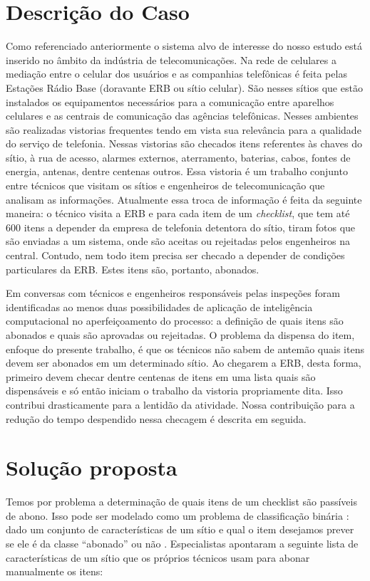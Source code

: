 \documentclass[
	12pt,				%
	openany,			%
	oneside,			%
	a4paper,			%
	english,			%
	french,				%
	spanish,			%
	brazil,				%
	]{abntex2}
\begin{document}
\chapter[Descrição do Caso]{Descrição do Caso}
Como referenciado anteriormente o sistema alvo de interesse do nosso estudo está
inserido no âmbito da indústria de telecomunicações. Na rede de celulares a
mediação entre o celular dos usuários e as companhias telefônicas é feita pelas
Estações Rádio Base (doravante ERB ou sítio celular). São nesses sítios que
estão instalados os equipamentos necessários para a comunicação entre aparelhos
celulares e as centrais de comunicação das agências telefônicas. Nesses
ambientes são realizadas vistorias frequentes tendo em vista sua relevância para
a qualidade do serviço de telefonia. Nessas vistorias são checados itens
referentes às chaves do sítio, à rua de acesso, alarmes externos, aterramento,
baterias, cabos, fontes de energia, antenas, dentre centenas outros. Essa
vistoria é um trabalho conjunto entre técnicos que visitam os sítios e
engenheiros de telecomunicação que analisam as informações. Atualmente essa
troca de informação é feita da seguinte maneira: o técnico visita a ERB e para
cada item de um \textit{checklist}, que tem até 600 itens a depender da
empresa de telefonia detentora do sítio, tiram fotos que são enviadas a um
sistema, onde são aceitas ou rejeitadas pelos engenheiros na central. Contudo,
nem todo item precisa ser checado a depender de condições particulares da ERB.
Estes itens são, portanto, abonados.

Em conversas com técnicos e engenheiros responsáveis pelas inspeções foram
identificadas ao menos duas possibilidades de aplicação de inteligência
computacional no aperfeiçoamento do processo: a definição de quais itens são
abonados e quais são aprovadas ou rejeitadas. O problema da dispensa do item,
enfoque do presente trabalho, é que os técnicos não sabem de antemão quais itens
devem ser abonados em um determinado sítio. Ao chegarem a ERB, desta forma,
primeiro devem checar dentre centenas de itens em uma lista quais são
dispensáveis e só então iniciam o trabalho da vistoria propriamente dita. Isso
contribui drasticamente para a lentidão da atividade. Nossa contribuição para a
redução do tempo despendido nessa checagem é descrita em seguida.

\chapter[Solução proposta]{Solução proposta}
Temos por problema a determinação de quais itens de um checklist são passíveis
de abono. Isso pode ser modelado como um problema de classificação binária :
dado um conjunto de características de um sítio e qual o item desejamos prever
se ele é da classe ``abonado'' ou não \cite{james2013introduction}.
Especialistas apontaram a seguinte lista de características de um sítio que os
próprios técnicos usam para abonar manualmente os itens:
\end{document}
